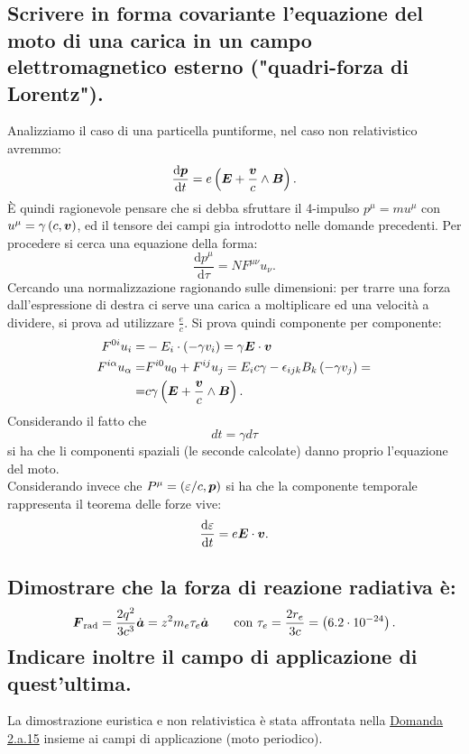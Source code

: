 \subsection[]{Scrivere in forma covariante l'equazione del moto di una carica in un campo elettromagnetico esterno ("quadri-forza di Lorentz").}
\label{sec:3.b.7}
Analizziamo il caso di una particella puntiforme, nel caso non relativistico avremmo: \[
	\frac{\mbox{d} \boldsymbol{p}}{\mbox{d} t} = e\left( \boldsymbol{E}+ \frac{\boldsymbol{v}}{c}\wedge \boldsymbol{B} \right) 
.\] 
È quindi ragionevole pensare che si debba sfruttare il 4-impulso $p^{\mu}=m u^{\mu}$ con $u^{\mu}=\gamma\left( c, \boldsymbol{v} \right)$, ed il tensore dei campi gia introdotto nelle domande precedenti. Per procedere si cerca una equazione della forma:
\[
	\frac{\mbox{d} p^{\mu}}{\mbox{d} \tau}= N F^{\mu\nu} u_{\nu} 
.\]
Cercando una normalizzazione ragionando sulle dimensioni: per trarre una forza dall'espressione di destra ci serve una carica a moltiplicare ed una velocità a dividere, si prova ad utilizzare $\frac{e}{c}$. Si prova quindi componente per componente:
\begin{align*}
	F^{0i}u_{i}=& -E_{i}\cdot \left( -\gamma v_{i} \right) =\gamma \boldsymbol{E}\cdot \boldsymbol{v}\\
	F^{i\alpha}u_{\alpha}=&F^{i 0}u_0+F^{ij}u_{j}=E_{i}c\gamma-\epsilon_{ijk}B_{k}\left( -\gamma v_{j} \right) =\\
	=& c\gamma\left(\boldsymbol{E}+\frac{\boldsymbol{v}}{c}\wedge \boldsymbol{B}   \right) 
.\end{align*}
Considerando il fatto che 
\[
	dt= \gamma d\tau
\]
si ha che li componenti spaziali (le seconde calcolate) danno proprio l'equazione del moto.\\
Considerando invece che $P^{\mu}=\left(\varepsilon /c, \boldsymbol{p} \right)$ si ha che la componente temporale rappresenta il teorema delle forze vive:
\[
	\frac{\mbox{d} \varepsilon}{\mbox{d} t} = e \boldsymbol{E}\cdot \boldsymbol{v}	
.\] 


\subsection[]{Dimostrare che la forza di reazione radiativa è: 
\[
	\boldsymbol{F}_{\text{rad}}=\frac{2q^2}{3c^3}\dot{\boldsymbol{a}}=z^2m_e \tau_e \dot{\boldsymbol{a}} \quad \quad \text{con } \tau_e=\frac{2r_{e}}{3c}=\left(6.2\cdot 10^{-24}\right)
.\]
Indicare inoltre il campo di applicazione di quest'ultima.
}\label{sec:3.b.8}
La dimostrazione euristica e non relativistica è stata affrontata nella \hyperref[subsec: 2.a.15]{Domanda 2.a.15} insieme ai campi di applicazione (moto periodico). 

